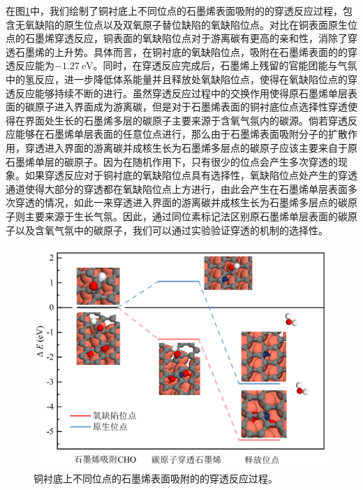 在图\ref{fig:FLG_DFT_CHOpene}中，我们绘制了铜衬底上不同位点的石墨烯表面吸附的的穿透反应过程，包含无氧缺陷的原生位点以及双氧原子替位缺陷的氧缺陷位点。对比在铜表面原生位点的石墨烯穿透反应，铜表面的氧缺陷位点对于游离碳有更高的亲和性，消除了穿透石墨烯的上升势。具体而言，在铜衬底的氧缺陷位点，吸附在石墨烯表面的的穿透反应能为$\SI{-1.27}{\electronvolt}$。同时，在穿透反应完成后，石墨烯上残留的官能团能与气氛中的氢反应，进一步降低体系能量并且释放处氧缺陷位点，使得在氧缺陷位点的穿透反应能够持续不断的进行。虽然穿透反应过程中的交换作用使得原石墨烯单层表面的碳原子进入界面成为游离碳，但是对于石墨烯表面的铜衬底位点选择性穿透使得在界面处生长的石墨烯多层的碳原子主要来源于含氧气氛内的碳源。倘若穿透反应能够在石墨烯单层表面的任意位点进行，那么由于石墨烯表面吸附分子的扩散作用，穿透进入界面的游离碳并成核生长为石墨烯多层点的碳原子应该主要来自于原石墨烯单层的碳原子。因为在随机作用下，只有很少的位点会产生多次穿透的现象。如果穿透反应对于铜衬底的氧缺陷位点具有选择性，氧缺陷位点处产生的穿透通道使得大部分的穿透都在氧缺陷位点上方进行，由此会产生在石墨烯单层表面多次穿透的情况，如此一来穿透进入界面的游离碳并成核生长为石墨烯多层点的碳原子则主要来源于生长气氛。因此，通过同位素标记法区别原石墨烯单层表面的碳原子以及含氧气氛中的碳原子，我们可以通过实验验证穿透的机制的选择性。
\begin{figure}[!htb]
    \includegraphics{pic/FLG_DFT_CHOpene.png}
    \caption{铜衬底上不同位点的石墨烯表面吸附的的穿透反应过程。}
    \label{fig:FLG_DFT_CHOpene}
\end{figure}

